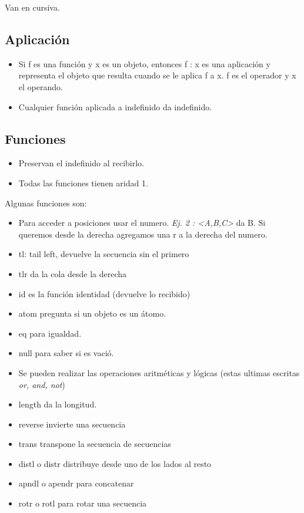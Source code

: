 Van en cursiva.


\subsection*{Aplicación}
\begin{itemize}
\item Si f es una función y x es un objeto, entonces f : x es una aplicación y representa el objeto que resulta cuando se le aplica f a x. f es el operador y x el operando.
\item Cualquier función aplicada a indefinido da indefinido.
\end{itemize}



\subsection*{Funciones}
\begin{itemize}
\item Preservan el indefinido al recibirlo.
\item Todas las funciones tienen aridad 1.
\end{itemize}

Algunas funciones son:
\begin{itemize}
\item Para acceder a posiciones usar el numero. \textit{Ej. 2 : <A,B,C>} da B. Si queremos desde la derecha agregamos una r a la derecha del numero.
\item tl: tail left, devuelve la secuencia sin el primero
\item tlr da la cola desde la derecha
\item id es la función identidad (devuelve lo recibido)
\item atom pregunta si un objeto es un átomo.
\item eq para igualdad.
\item null para saber si es vació.
\item Se pueden realizar las operaciones aritméticas y lógicas (estas ultimas escritas \textit{or, and, not})
\item length da la longitud.
\item reverse invierte una secuencia
\item trans transpone la secuencia de secuencias
\item distl o distr distribuye desde uno de los lados al resto
\item apndl o apendr para concatenar
\item rotr o rotl para rotar una secuencia
\end{itemize}


